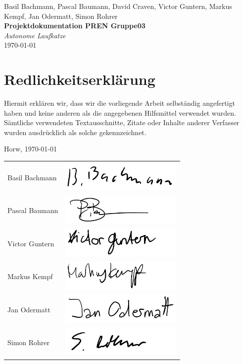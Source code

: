 \documentclass[a4paper]{report}
\newcommand*{\titleAP}{\begingroup %
	\centering
	\vspace*{\baselineskip} %

	{Basil Bachmann, Pascal Baumann, David Craven, Victor Guntern, Markus Kempf, Jan Odermatt, Simon Rohrer}\\[0.167\textheight] %

	{\Huge\bfseries Projektdokumentation PREN Gruppe03}\\[\baselineskip]

	{\Large \textit{Autonome Laufkatze}}\\
	\today

	\vspace*{3\baselineskip} %
	\endgroup}
\begin{document}

\titleAP

\newpage

\chapter*{Redlichkeitserklärung}
\label{ch*:Redlich}
Hiermit erklären wir, dass wir die vorliegende Arbeit selbständig angefertigt haben und keine anderen als die angegebenen Hilfsmittel verwendet wurden. Sämtliche verwendeten Textausschnitte, Zitate oder Inhalte anderer Verfasser wurden ausdrücklich als solche gekennzeichnet.

\vspace{1.5em}

\noindent
Horw, \today

\vspace{2em}

\noindent
\begin{tabular}{lp{}}
	Basil Bachmann & \includegraphics[height=1.5cm,keepaspectratio]{BasilBachmann}\\
	Pascal Baumann & \includegraphics[height=1.5cm,keepaspectratio]{PascalBaumann}\\
	Victor Guntern & \includegraphics[height=1.5cm,keepaspectratio]{VictorGuntern}\\
	Markus Kempf & \includegraphics[height=1.5cm,keepaspectratio]{MarkusKempf}\\
	Jan Odermatt & \includegraphics[height=1.5cm,keepaspectratio]{JanOdermatt}\\
	Simon Rohrer &  \includegraphics[height=1.5cm,keepaspectratio]{SimonRohrer}\\
\end{tabular}
\end{document}
